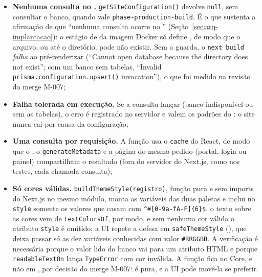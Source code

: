 \begin{itemize}
  \item \textbf{Nenhuma consulta no .} \texttt{getSiteConfiguration()} devolve \texttt{null}, sem consultar o banco, quando  vale \texttt{phase-production-build}. É o que sustenta a afirmação de que ``nenhuma consulta ocorre no '' (Seção~\ref{sec:arq-implantacao}): o estágio de  da imagem Docker só define , de modo que o arquivo, ou até o diretório, pode não existir. Sem a guarda, o \texttt{next build} \emph{falha} ao pré-renderizar  (``Cannot open database because the directory does not exist''; com um banco sem tabelas, ``Invalid \texttt{prisma.configuration.upsert()} invocation''), o que foi medido na revisão do merge M-007;
  \item \textbf{Falha tolerada em execução.} Se a consulta lançar (banco indisponível ou sem as tabelas), o erro é registrado no servidor e valem os padrões do : o site nunca cai por causa da configuração;
  \item \textbf{Uma consulta por requisição.} A função usa o \texttt{cache} do React, de modo que o , o \texttt{generateMetadata} e a página do mesmo pedido (portal, login ou painel) compartilham o resultado (fora do servidor do Next.js, como nos testes, cada chamada consulta);
  \item \textbf{Só cores válidas.} \texttt{buildThemeStyle(registro)}, função pura e sem imports do Next.js no mesmo módulo, monta as variáveis das duas paletas e inclui no \texttt{style} somente os valores que casam com \texttt{\^{}\#[0-9a-fA-F]\{6\}\$}. o texto sobre as cores vem de \texttt{textColorsOf}, por modo, e sem nenhuma cor válida o atributo \texttt{style} é omitido; a UI repete a defesa em \texttt{safeThemeStyle} (), que deixa passar só as dez variáveis conhecidas com valor \texttt{\#RRGGBB}. A verificação é necessária porque o valor lido do banco vai para um atributo HTML e porque \texttt{readableTextOn} lança \texttt{TypeError} com cor inválida. A função fica no Core, e não em , por decisão do merge M-007: é pura, e a UI pode movê-la se preferir.
\end{itemize}

